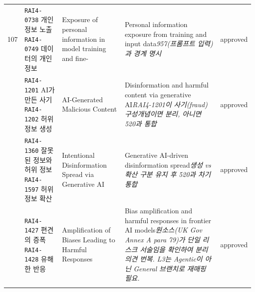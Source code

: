 \begin{longtable}{p{0.6cm}p{4.2cm}p{3.3cm}p{4.6cm}p{1.5cm}}
107 & \texttt{RAI4-0738} 개인정보 노출\newline \texttt{RAI4-0749} 데이터의 개인정보 & Exposure of personal information in model training and fine- & Personal information exposure from training and input data\newline \emph{957(프롬프트 입력)과 경계 명시} & approved \\ \addlinespace
1574 & \texttt{RAI4-1201} AI가 만든 사기\newline \texttt{RAI4-1202} 허위정보 생성 & AI-Generated Malicious Content & Disinformation and harmful content via generative AI\newline \emph{RAI4-1201이 사기(fraud) 구성개념이면 분리, 아니면 520과 통합} & approved \\ \addlinespace
1575 & \texttt{RAI4-1360} 잘못된 정보와 허위 정보\newline \texttt{RAI4-1597} 허위 정보 확산 & Intentional Disinformation Spread via Generative AI & Generative AI-driven disinformation spread\newline \emph{생성 vs 확산 구분 유지 후 520과 차기 통합} & approved \\ \addlinespace
1561 & \texttt{RAI4-1427} 편견의 증폭\newline \texttt{RAI4-1428} 유해한 반응 & Amplification of Biases Leading to Harmful Responses & Bias amplification and harmful responses in frontier AI models\newline \emph{원소스(UK Gov Annex A para 79)가 단일 리스크 서술임을 확인하여 분리 의견 번복. L3는 Agentic이 아닌 General 브랜치로 재매핑 필요.} & approved \\ \addlinespace
\bottomrule
\end{longtable}